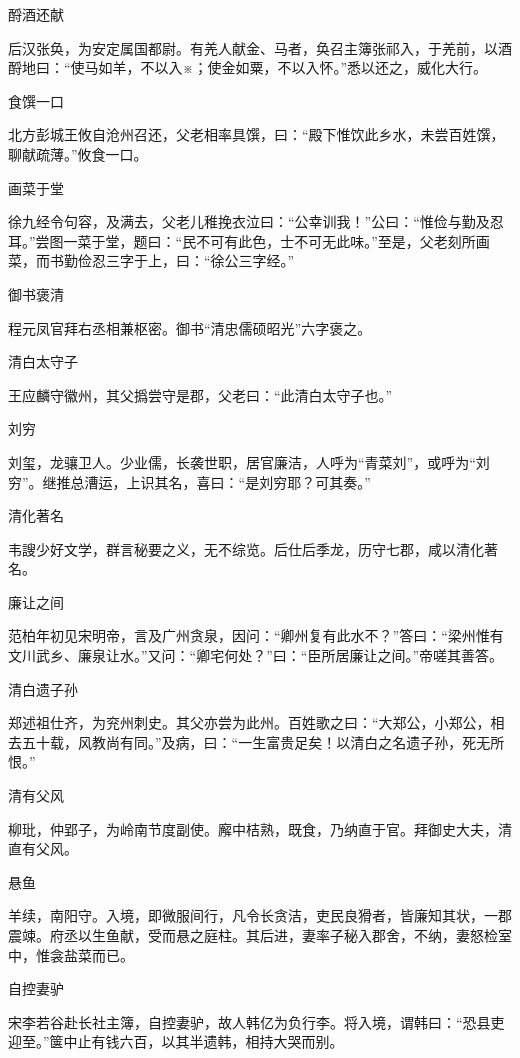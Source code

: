 \documentclass[a4paper,12pt,UTF8,twoside]{ctexbook}
\begin{document}
    酹酒还献
    
    后汉张奂，为安定属国都尉。有羌人献金、马者，奂召主簿张祁入，于羌前，以酒酹地曰：“使马如羊，不以入※；使金如粟，不以入怀。”悉以还之，威化大行。
    
    食馔一口
    
    北方彭城王攸自沧州召还，父老相率具馔，曰：“殿下惟饮此乡水，未尝百姓馔，聊献疏薄。”攸食一口。
    
    画菜于堂
    
    徐九经令句容，及满去，父老儿稚挽衣泣曰：“公幸训我！”公曰：“惟俭与勤及忍耳。”尝图一菜于堂，题曰：“民不可有此色，士不可无此味。”至是，父老刻所画菜，而书勤俭忍三字于上，曰：“徐公三字经。”
    
    御书褒清
    
    程元凤官拜右丞相兼枢密。御书“清忠儒硕昭光”六字褒之。
    
    清白太守子
    
    王应麟守徽州，其父撝尝守是郡，父老曰：“此清白太守子也。”
    
    刘穷
    
    刘玺，龙骧卫人。少业儒，长袭世职，居官廉洁，人呼为“青菜刘”，或呼为“刘穷”。继推总漕运，上识其名，喜曰：“是刘穷耶？可其奏。”
    
    清化著名
    
    韦謏少好文学，群言秘要之义，无不综览。后仕后季龙，历守七郡，咸以清化著名。
    
    廉让之间
    
    范柏年初见宋明帝，言及广州贪泉，因问：“卿州复有此水不？”答曰：“梁州惟有文川武乡、廉泉让水。”又问：“卿宅何处？”曰：“臣所居廉让之间。”帝嗟其善答。
    
    清白遗子孙
    
    郑述祖仕齐，为兖州刺史。其父亦尝为此州。百姓歌之曰：“大郑公，小郑公，相去五十载，风教尚有同。”及病，曰：“一生富贵足矣！以清白之名遗子孙，死无所恨。”
    
    清有父风
    
    柳玭，仲郢子，为岭南节度副使。廨中桔熟，既食，乃纳直于官。拜御史大夫，清直有父风。
    
    悬鱼
    
    羊续，南阳守。入境，即微服间行，凡令长贪洁，吏民良猾者，皆廉知其状，一郡震竦。府丞以生鱼献，受而悬之庭柱。其后进，妻率子秘入郡舍，不纳，妻怒检室中，惟衾盐菜而已。
    
    自控妻驴
    
    宋李若谷赴长社主簿，自控妻驴，故人韩亿为负行李。将入境，谓韩曰：“恐县吏迎至。”箧中止有钱六百，以其半遗韩，相持大哭而别。
    
\end{document}
